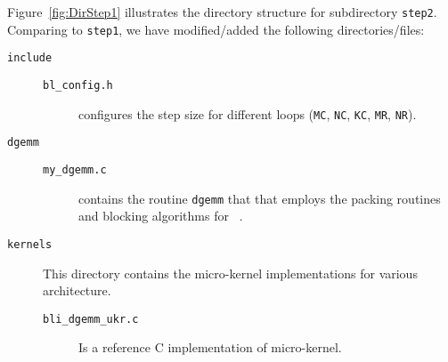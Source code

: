 Figure~\ref{fig:DirStep1} illustrates the directory
structure for subdirectory {\tt step2}. Comparing to {\tt step1}, we have modified/added the following directories/files:

\begin{description}
\item[{\tt include}] 
\begin{description}
\item[{\tt bl\_config.h}] configures the step size for different loops ({\tt MC}, {\tt NC}, {\tt KC}, {\tt MR}, {\tt NR}).
\end{description}
\item[{\tt dgemm}]
\begin{description}
\item[{\tt my\_dgemm.c}] contains the routine {\tt dgemm} that
  that employs the packing routines and blocking algorithms for \Gemm\ .
\end{description}
\item[{\tt kernels}] This directory contains the micro-kernel implementations for various architecture.
\begin{description}
\item[{\tt bli\_dgemm\_ukr.c}] Is a reference C implementation of micro-kernel.
\end{description}
\end{description}


